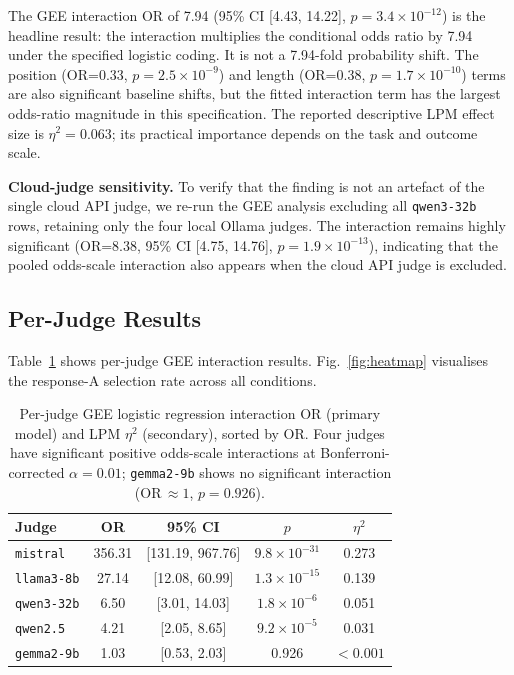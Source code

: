 \documentclass[10pt,conference]{IEEEtran}
\begin{document}
The GEE interaction OR of 7.94 (95\% CI [4.43, 14.22], $p=3.4\times10^{-12}$) is the headline result: the interaction multiplies the conditional odds ratio by 7.94 under the specified logistic coding. It is not a 7.94-fold probability shift. The position (OR=0.33, $p=2.5\times10^{-9}$) and length (OR=0.38, $p=1.7\times10^{-10}$) terms are also significant baseline shifts, but the fitted interaction term has the largest odds-ratio magnitude in this specification. The reported descriptive LPM effect size is $\eta^2=0.063$; its practical importance depends on the task and outcome scale.

\textbf{Cloud-judge sensitivity.} To verify that the finding is not an artefact of the single cloud API judge, we re-run the GEE analysis excluding all \texttt{qwen3-32b} rows, retaining only the four local Ollama judges. The interaction remains highly significant (OR=8.38, 95\% CI [4.75, 14.76], $p=1.9\times10^{-13}$), indicating that the pooled odds-scale interaction also appears when the cloud API judge is excluded.

\subsection{Per-Judge Results}
Table~\ref{tab:perjudge} shows per-judge GEE interaction results. Fig.~\ref{fig:heatmap} visualises the response-A selection rate across all conditions.

\begin{table}[t]
\caption{Per-judge GEE logistic regression interaction OR (primary model) and LPM $\eta^2$ (secondary), sorted by OR. Four judges have significant positive odds-scale interactions at Bonferroni-corrected $\alpha=0.01$; \texttt{gemma2-9b} shows no significant interaction (OR\,$\approx1$, $p=0.926$).}
\label{tab:perjudge}
\centering
\footnotesize
\begin{tabular}{@{}lcccc@{}}
\toprule
Judge & OR & 95\% CI & $p$ & $\eta^2$ \\
\midrule
\texttt{mistral} & 356.31 & [131.19, 967.76] & $9.8\times10^{-31}$ & 0.273 \\
\texttt{llama3-8b} & 27.14 & [12.08, 60.99] & $1.3\times10^{-15}$ & 0.139 \\
\texttt{qwen3-32b} & 6.50 & [3.01, 14.03] & $1.8\times10^{-6}$ & 0.051 \\
\texttt{qwen2.5} & 4.21 & [2.05, 8.65] & $9.2\times10^{-5}$ & 0.031 \\
\texttt{gemma2-9b} & 1.03 & [0.53, 2.03] & 0.926 & $<0.001$ \\
\bottomrule
\end{tabular}
\end{table}
\end{document}
